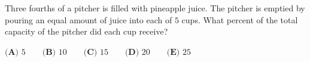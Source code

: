 Three fourths of a pitcher is filled with pineapple juice. The pitcher is emptied by pouring an equal amount of juice into each of $5$ cups. What percent of the total capacity of the pitcher did each cup receive?

$\textbf{(A) }5 \qquad \textbf{(B) }10 \qquad \textbf{(C) }15 \qquad \textbf{(D) }20 \qquad \textbf{(E) }25$
